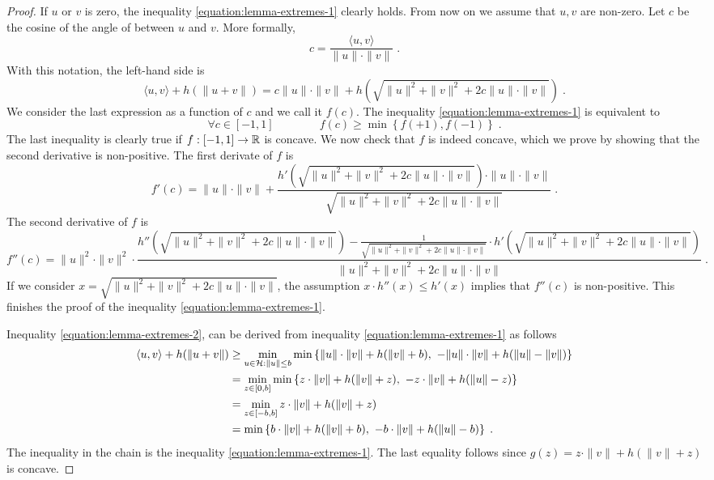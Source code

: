 \begin{proof}
If $u$ or $v$ is zero, the inequality \eqref{equation:lemma-extremes-1} clearly holds. From now on we assume that
$u,v$ are non-zero. Let $c$ be the cosine of the angle of between $u$ and $v$.
More formally,
$$
c = \frac{\langle u, v \rangle}{\|u\| \cdot \|v\|} \; .
$$
With this notation, the left-hand side is
$$
\langle u, v \rangle + h(\|u + v\|) = c \|u\| \cdot \|v\|  + h(\sqrt{\|u\|^2 + \|v\|^2 + 2 c \|u\| \cdot \|v\|}) \; .
$$
We consider the last expression as a function of $c$ and we call it $f(c)$. The
inequality \eqref{equation:lemma-extremes-1} is equivalent to
$$
\forall c \in [-1,1] \qquad \qquad f(c) \ge \min \left\{f(+1), f(-1)\right\} \; .
$$
The last inequality is clearly true if $f:[-1,1] \to \mathbb{R}$ is concave. We now
check that $f$ is indeed concave, which we prove by showing that the second
derivative is non-positive. The first derivate of $f$ is
$$
f'(c) = \|u\| \cdot \|v\| + \frac{h'(\sqrt{\|u\|^2 + \|v\|^2 + 2 c \|u\| \cdot \|v\|}) \cdot \|u\| \cdot \|v\|}{\sqrt{\|u\|^2 + \|v\|^2 + 2 c \|u\| \cdot \|v\|}} \; .
$$
The second derivative of $f$ is
$$
f''(c) = \|u\|^2 \cdot \|v\|^2 \cdot \frac{h''(\sqrt{\|u\|^2 + \|v\|^2 + 2 c \|u\| \cdot \|v\|})  - \frac{1}{\sqrt{\|u\|^2 + \|v\|^2 + 2c \|u\| \cdot \|v\|}} \cdot h'(\sqrt{\|u\|^2 + \|v\|^2 + 2 c \|u\| \cdot \|v\|})  }{\|u\|^2 + \|v\|^2 + 2 c \|u\| \cdot \|v\|} \; .
$$
If we consider $x=\sqrt{\|u\|^2 + \|v\|^2 + 2 c \|u\| \cdot \|v\|}$, the
assumption $x \cdot h''(x) \le h'(x)$ implies that $f''(c)$ is non-positive.
This finishes the proof of the inequality \eqref{equation:lemma-extremes-1}.

Inequality \eqref{equation:lemma-extremes-2}, can be derived from inequality
\eqref{equation:lemma-extremes-1} as follows
\begin{align*}
\langle u, v \rangle + h(\|u + v\|)
& \ge \min_{u \in \H : \|u\| \le b} \min \left\{ \|u\| \cdot \|v\| + h(\|v\| + b), \ - \|u\| \cdot \|v\| + h(\|u\| - \|v\|) \right\} \\
& = \min_{z \in [0,b]} \min \left\{ z \cdot \|v\| + h(\|v\| + z), \ - z \cdot \|v\| + h(\|u\| - z) \right\} \\
& = \min_{z \in [-b,b]} z \cdot \|v\| + h(\|v\| + z) \\
& = \min \left\{ b \cdot \|v\| + h(\|v\| + b), \ - b \cdot \|v\| + h(\|u\| - b) \right\} \; .
\end{align*}
The inequality in the chain is the inequality \eqref{equation:lemma-extremes-1}.
The last equality follows since $g(z) = z \cdot \|v\| + h(\|v\| + z)$
is concave.
\end{proof}

